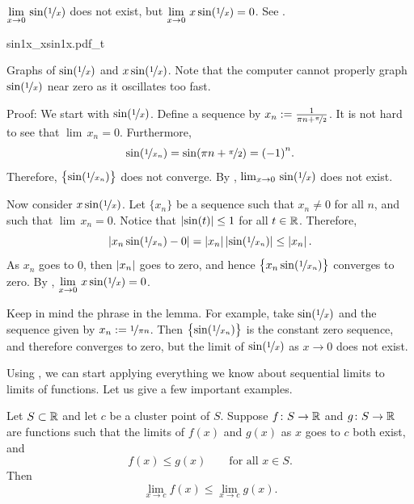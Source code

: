 \begin{example}
$\displaystyle \lim_{x \to 0} \, \sin( \nicefrac{1}{x} )$
does not exist, but 
$\displaystyle \lim_{x \to 0} \, x\sin( \nicefrac{1}{x} ) = 0$.
See .

\begin{myfigureht}
{sin1x_xsin1x.pdf_t}
\caption{Graphs of $\sin(\nicefrac{1}{x})$ and $x \sin(\nicefrac{1}{x})$.
Note that the computer cannot properly graph $\sin(\nicefrac{1}{x})$
near zero as it oscillates too fast.\label{figsin1x}}
\end{myfigureht}

Proof:
We start with $\sin(\nicefrac{1}{x})$.  Define a sequence
by
$x_n := \frac{1}{\pi n + \nicefrac{\pi}{2}}$.  It is not hard to see
that $\lim\, x_n = 0$.  Furthermore,
\begin{equation*}
\sin ( \nicefrac{1}{x_n} )
=
\sin (\pi n + \nicefrac{\pi}{2})
= {(-1)}^n .
\end{equation*}
Therefore, $\bigl\{ \sin ( \nicefrac{1}{x_n} ) \bigr\}$ does not converge.
By
, 
$\lim_{x \to 0} \, \sin( \nicefrac{1}{x} )$ does not exist.

Now consider $x\sin(\nicefrac{1}{x})$.  Let $\{ x_n \}$ be a sequence
such that $x_n \not= 0$ for all $n$, and such that $\lim\, x_n = 0$.
Notice that $\left\lvert {\sin(t)} \right\rvert \leq 1$ for all $t \in {\mathbb{R}}$.  Therefore,
\begin{equation*}
\left\lvert {x_n\sin(\nicefrac{1}{x_n})-0} \right\rvert
=
\left\lvert {x_n} \right\rvert\left\lvert {\sin(\nicefrac{1}{x_n})} \right\rvert
\leq
\left\lvert {x_n} \right\rvert .
\end{equation*}
As $x_n$ goes to 0, then $\left\lvert {x_n} \right\rvert$ goes to zero, and hence
$\bigl\{ x_n\sin(\nicefrac{1}{x_n}) \bigr\}$ converges to zero.  By
, 
$\displaystyle \lim_{x \to 0} \, x\sin( \nicefrac{1}{x} ) = 0$.
\end{example}

Keep in mind the phrase  in the lemma.
For example, take $\sin(\nicefrac{1}{x})$ and the sequence given by
$x_n := \nicefrac{1}{\pi n}$.
Then $\bigl\{ \sin (\nicefrac{1}{x_n}) \bigr\}$ is the constant zero sequence, and
therefore converges to zero, but the limit of 
$\sin(\nicefrac{1}{x})$ as $x \to 0$ does not exist.

Using , 
we can start applying everything we know about
sequential limits to limits of functions.  Let us give a few important
examples.

\begin{cor}
Let $S \subset {\mathbb{R}}$ and let $c$ be a cluster point of $S$.  
Suppose $f \colon S \to
{\mathbb{R}}$ and $g \colon S \to {\mathbb{R}}$ are functions
such that
the limits of $f(x)$ and $g(x)$ as $x$ goes to $c$ both exist,
and
\begin{equation*}
f(x) \leq g(x) \qquad \text{for all } x \in S.
\end{equation*}
Then
\begin{equation*}
\lim_{x\to c} f(x) \leq \lim_{x\to c} g(x) .
\end{equation*}
\end{cor}

